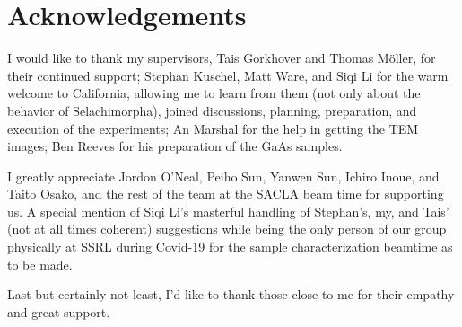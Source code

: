 \begingroup
\let\cleardoubepage\relax
\chapter*{Acknowledgements}
\endgroup
\onehalfspacing
I would like to thank my supervisors, Tais Gorkhover and Thomas Möller, for their continued support; 
Stephan Kuschel, Matt Ware, and Siqi Li for the warm welcome to California, allowing me to learn from them (not only about the behavior of Selachimorpha), joined discussions, planning, preparation, and execution of the experiments; An Marshal for the help in getting the TEM images; Ben Reeves for his preparation of the GaAs samples.

I greatly appreciate Jordon O'Neal, Peiho Sun, Yanwen Sun, Ichiro Inoue, and Taito Osako, and the rest of the team at the SACLA beam time for supporting us. A special mention of Siqi Li's masterful handling of Stephan's, my, and Tais' (not at all times coherent) suggestions while being the only person of our group physically at SSRL during Covid-19  for the sample characterization beamtime as to be made.

Last but certainly not least, I'd like to thank those close to me for their empathy and great support.
